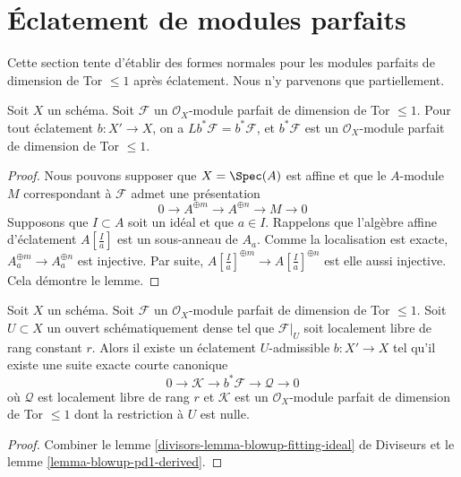 \section{Éclatement de modules parfaits}
\label{section-blowup-perfect-modules}

\noindent
Cette section tente d'établir des formes normales pour les modules parfaits de dimension de Tor
$\leq 1$ après éclatement. Nous n'y parvenons que partiellement.

\begin{lemma}
\label{lemma-blowup-pd1-derived}
Soit $X$ un schéma. Soit $\mathcal{F}$ un
$\mathcal{O}_X$-module parfait de dimension de Tor $\leq 1$. Pour tout
éclatement $b : X' \to X$, on a $Lb^*\mathcal{F} = b^*\mathcal{F}$,
et $b^*\mathcal{F}$ est un $\mathcal{O}_X$-module parfait
de dimension de Tor $\leq 1$.
\end{lemma}

\begin{proof}
Nous pouvons supposer que $X = \Spec(A)$ est affine et que le $A$-module $M$
correspondant à $\mathcal{F}$ admet une présentation
$$
0 \to A^{\oplus m} \to A^{\oplus n} \to M \to 0
$$
Supposons que $I \subset A$ soit un idéal et que $a \in I$. Rappelons que
l'algèbre affine d'éclatement $A[\frac{I}{a}]$ est un sous-anneau de $A_a$.
Comme la localisation est exacte, $A_a^{\oplus m} \to A_a^{\oplus n}$
est injective. Par suite, $A[\frac{I}{a}]^{\oplus m} \to A[\frac{I}{a}]^{\oplus n}$
est elle aussi injective. Cela démontre le lemme.
\end{proof}

\begin{lemma}
\label{lemma-blowup-pd1}
Soit $X$ un schéma. Soit $\mathcal{F}$ un $\mathcal{O}_X$-module parfait
de dimension de Tor $\leq 1$. Soit $U \subset X$ un ouvert schématiquement
dense tel que $\mathcal{F}|_U$ soit localement libre de rang constant
$r$. Alors il existe un éclatement $U$-admissible $b : X' \to X$ tel qu'il
existe une suite exacte courte canonique
$$
0 \to \mathcal{K} \to b^*\mathcal{F} \to \mathcal{Q} \to 0
$$
où $\mathcal{Q}$ est localement libre de rang $r$ et
$\mathcal{K}$ est un $\mathcal{O}_X$-module parfait
de dimension de Tor $\leq 1$ dont la restriction à $U$ est nulle.
\end{lemma}

\begin{proof}
Combiner le lemme \ref{divisors-lemma-blowup-fitting-ideal} de Diviseurs et
le lemme \ref{lemma-blowup-pd1-derived}.
\end{proof}

